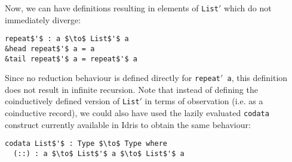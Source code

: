 Now, we can have definitions resulting in elements of \texttt{List$'$} which do
not immediately diverge:
\begin{lstlisting}[mathescape,title=\idrisBlock]
repeat$'$ : a $\to$ List$'$ a
&head repeat$'$ a = a 
&tail repeat$'$ a = repeat$'$ a
\end{lstlisting}
Since no reduction behaviour is defined directly for \texttt{repeat$'$ a}, this
definition does not result in infinite recursion. Note that instead of defining
the coinductively defined version of \texttt{List$'$} in terms of
observation (i.e. as a coinductive record), we could also have used the lazily
evaluated \texttt{codata} construct currently available in Idris to obtain the
same behaviour:
\begin{lstlisting}[mathescape,title=\idrisBlock]
codata List$'$ : Type $\to$ Type where
  (::) : a $\to$ List$'$ a $\to$ List$'$ a
\end{lstlisting}





